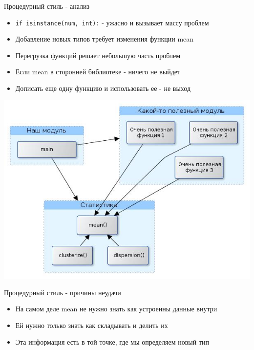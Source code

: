\documentclass{article}
\begin{document}
\begin{center} Процедурный стиль - анализ \end{center}
\begin{itemize}
    \item \lstinline!if isinstance(num, int):! - ужасно и вызывает массу проблем
    \item Добавление новых типов требует изменения функции mean
    \item Перегрузка функций решает небольшую часть проблем
    \item Если mean в сторонней библиотеке - ничего не выйдет
    \item Дописать еще одну функцию и использовать ее - не выход
\end{itemize}
\begin{center} \includegraphics[scale=0.6]{images/code_structure.jpg} \end{center} 
\newpage

\begin{center} Процедурный стиль - причины неудачи \end{center}
\begin{itemize}
    \item На самом деле mean не нужно знать как устроенны данные внутри
    \item Ей нужно только знать как складывать и делить их
    \item Эта информация есть в той точке, где мы определяем новый тип
\end{itemize}
\newpage
\end{document}
